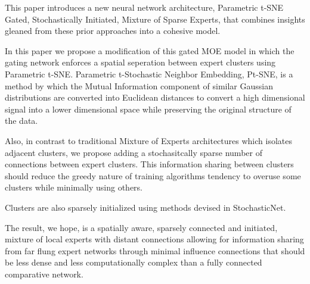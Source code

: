 \documentclass{llncs}
\begin{document}
This paper introduces a new neural network architecture, Parametric t-SNE Gated, Stochastically Initiated, Mixture of Sparse Experts, that combines insights gleaned from these prior approaches into a cohesive model.

In this paper we propose a modification of this gated MOE model in which the gating network enforces a spatial seperation between expert clusters using Parametric t-SNE. Parametric t-Stochastic Neighbor Embedding, Pt-SNE, is a method by which the Mutual Information component of similar Gaussian distributions are converted into Euclidean distances to convert a high dimensional signal into a lower dimensional space while preserving the original structure of the data.

Also, in contrast to traditional Mixture of Experts architectures which isolates adjacent clusters, we propose adding a stochasitcally sparse number of connections between expert clusters. This information sharing between clusters should reduce the greedy nature of training algorithms tendency to overuse some clusters while minimally using others.

Clusters are also sparsely initialized using methods devised in StochasticNet.

The result, we hope, is a spatially aware, sparsely connected and initiated, mixture of local experts with distant connections allowing for information sharing from far flung expert networks through minimal influence connections that should be less dense and less computationally complex than a fully connected comparative network.~\cite{Caswell:2016aa,Krizhevsky:2011aa,Sporns:2004aa,Kiyono:2019aa,Hassibi:1993aa,LeCun:1990aa,Zorins:2015aa,Samsonovich:2005aa,Morris:2003aa,Watts:1998aa,Han:2015aa,Huang:2017aa,Srivastava:2014aa,Zhigulin:2004aa,Hinton:2012aa,Mocanu:2018aa,Wan:2013aa,Shazeer:2017aa,Jacobs_1991,Cayco-Gajic:2017aa,SPORNS_2004,DBLP:journals/corr/FernandoBBZHRPW17,NIPS2015_5784,Bassett:2006aa,cite-key}

%
%
 
 

\end{document}
